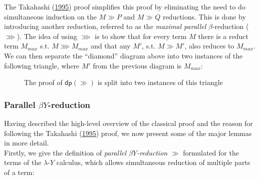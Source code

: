 \documentclass[a4paper, 12pt, twoside]{style/ociamthesis}
\theoremstyle{plain}
\theoremstyle{definition}
\theoremstyle{remark}
\newcommand{\lamy}{\lambda\text{-}Y}
\newcommand{\dip}{\textsf{dp}}
\begin{document}
The Takahashi (\protect\hyperlink{ref-takahashi95}{1995}) proof
simplifies this proof by eliminating the need to do simultaneous
induction on the \(M \gg P\) and \(M \gg Q\) reductions. This is done by
introducing another reduction, referred to as the \emph{maximal
parallel} \(\beta\)-reduction (\(\ggg\)). The idea of using \(\ggg\) is
to show that for every term \(M\) there is a reduct term \(M_{max}\)
s.t. \(M \ggg M_{max}\) and that any \(M'\), s.t. \(M \gg M'\), also
reduces to \(M_{max}\). We can then separate the ``diamond'' diagram
above into two instances of the following triangle, where \(M'\) from
the previous diagram is \(M_{max}\):

\begin{figure}
\begin{center}
\end{center}
\caption{The proof of $\dip(\gg)$ is split into two instances of this triangle}
\label{figure:gggTriangle}
\end{figure}

\newpage

\subsubsection{\texorpdfstring{Parallel
\(\beta Y\)-reduction}{Parallel \textbackslash{}beta Y-reduction}}\label{parallel-beta-y-reduction}

Having described the high-level overview of the classical proof and the
reason for following the Takahashi
(\protect\hyperlink{ref-takahashi95}{1995}) proof, we now present some
of the major lemmas in more detail.\\
Firstly, we give the definition of \emph{parallel \(\beta Y\)-reduction}
\(\gg\) formulated for the terms of the \(\lamy\) calculus, which allows
simultaneous reduction of multiple parts of a term:
\end{document}
